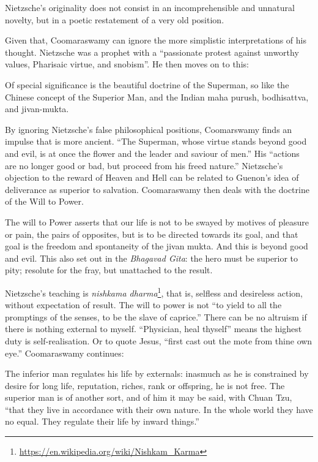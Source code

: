 \begin{quotex} Nietzsche's originality does not consist in an incomprehensible and unnatural novelty, but in a poetic restatement of a very old position.
\end{quotex}


Given that, Coomaraswamy can ignore the more simplistic interpretations of his thought. Nietzsche was a prophet with a ``passionate protest against unworthy values, Pharisaic virtue, and snobism''. He then moves on to this:

\begin{quotex}
Of special significance is the beautiful doctrine of the Superman, so like the Chinese concept of the Superior Man, and the Indian maha purush, bodhisattva, and jivan-mukta.
\end{quotex}


By ignoring Nietzsche's false philosophical positions, Coomarswamy finds an impulse that is more ancient. ``The Superman, whose virtue stands beyond good and evil, is at once the flower and the leader and saviour of men.'' His ``actions are no longer good or bad, but proceed from his freed nature.'' Nietzsche's objection to the reward of Heaven and Hell can be related to Guenon's idea of deliverance as superior to salvation. Coomaraswamy then deals with the doctrine of the Will to Power.

\begin{quotex}
The will to Power asserts that our life is not to be swayed by motives of pleasure or pain, the pairs of opposites, but is to be directed towards its goal, and that goal is the freedom and spontaneity of the jivan mukta. And this is beyond good and evil. This also set out in the \emph{Bhagavad Gita}: the hero must be superior to pity; resolute for the fray, but unattached to the result.
\end{quotex}


Nietzsche's teaching is \emph{nishkama dharma}\footnote{\url{https://en.wikipedia.org/wiki/Nishkam\_Karma}}, that is, selfless and desireless action, without expectation of result. The will to power is not ``to yield to all the promptings of the senses, to be the slave of caprice.'' There can be no altruism if there is nothing external to myself. ``Physician, heal thyself'' means the highest duty is self-realisation. Or to quote Jesus, ``first cast out the mote from thine own eye.'' Coomaraswamy continues:

\begin{quotex}
The inferior man regulates his life by externals: inasmuch as he is constrained by desire for long life, reputation, riches, rank or offspring, he is not free. The superior man is of another sort, and of him it may be said, with Chuan Tzu, ``that they live in accordance with their own nature. In the whole world they have no equal. They regulate their life by inward things.''
\end{quotex}


